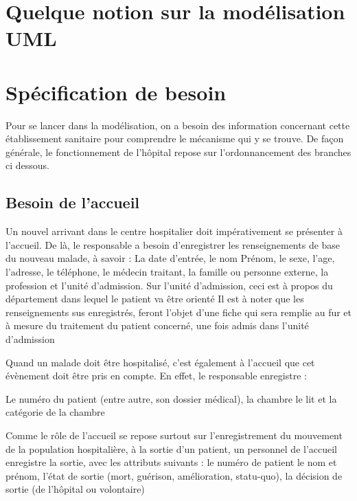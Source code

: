 	
	
	
	
	
	
	
	
	
	\section{Quelque notion sur la modélisation UML}
	
	\newpage
	\section{Spécification de besoin}
	Pour se lancer dans la modélisation, on a besoin des information concernant cette établissement sanitaire pour comprendre le mécanisme qui y se trouve.
	De façon générale, le fonctionnement de l'hôpital repose sur l'ordonnancement des
	branches ci dessous.
	
	\subsection{Besoin de l'accueil }
	Un nouvel arrivant dans le centre hospitalier doit impérativement se présenter à l'accueil.
	De là, le responsable a besoin d'enregistrer les renseignements de base du nouveau malade, à
	savoir :
	La date d'entrée, le nom Prénom, le sexe, l'age, l'adresse, le téléphone, le médecin traitant, la famille ou personne externe,  la profession et l'unité d'admission.
	 Sur l'unité d'admission, ceci est à propos du département dans lequel le patient va être orienté
	Il est à noter que les renseignements sus enregistrés, feront l'objet d'une fiche qui
	sera remplie au fur et à mesure du traitement du patient concerné, une fois admis
	dans l'unité d'admission
	
	\medskip
	
	Quand un malade doit être hospitalisé, c'est également à l'accueil que cet évènement
	doit être pris en compte. En effet, le responsable enregistre :
	
	Le numéro du patient (entre autre, son dossier médical), la chambre le lit et la catégorie de la chambre
	
	\medskip
	Comme le rôle de l'accueil se repose surtout sur l'enregistrement du mouvement de la	population hospitalière, à la sortie d'un patient, un personnel de l'accueil enregistre la	sortie, avec les attributs suivants :
	le numéro de patient	le nom et prénom, l'état de sortie (mort, guérison, amélioration, statu-quo), la décision de sortie (de l'hôpital ou volontaire)




